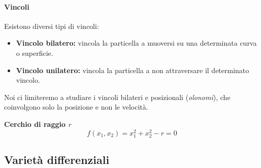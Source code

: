 \paragraph{Vincoli}
Esistono diversi tipi di vincoli:
\begin{itemize}
    \item \textbf{Vincolo bilatero:} vincola la particella a muoversi su una determinata curva o superficie.
    \item \textbf{Vincolo unilatero: } vincola la particella a non attraversare il determinato vincolo.
\end{itemize}
Noi ci limiteremo a studiare i vincoli bilateri e posizionali (\textit{olonomi}), che coinvolgono solo la posizione e non le velocità.

\begin{example}
    \textbf{Cerchio di raggio $r$}
    \begin{equation*}
        f(x_1,x_2)= x_1^2+x_2^2-r=0
    \end{equation*}
\end{example}



\subsection{Varietà differenziali}

